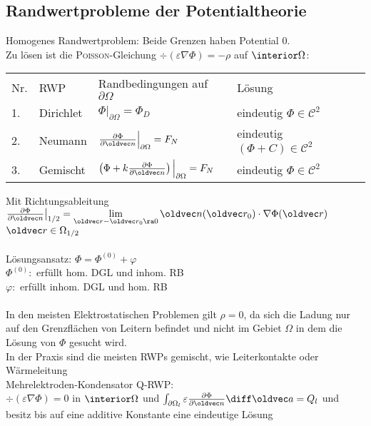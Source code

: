 \documentclass[6pt,a4paper]{scrartcl}
\let\vec\oldvec
\begin{document}
\begin{multicols}{4}
	\subsection{Randwertprobleme der Potentialtheorie}
	Homogenes Randwertproblem: Beide Grenzen haben Potential 0.\\
	Zu lösen ist die \textsc{Poisson}-Gleichung $\div(\varepsilon \nabla \Phi) = -\rho$ auf $\interior \Omega$:\\
	\begin{tabular*}{\columnwidth}{@{\extracolsep\fill}llll@{}}
	Nr. & RWP & Randbedingungen auf $\partial \Omega$ & Lösung\\
	1. & Dirichlet & $\Phi\big|_{\partial\Omega} = \Phi_D$ & eindeutig $\Phi \in \mathcal C^2$\\[0.5em]
	2. & Neumann & $\frac{\partial \Phi}{\partial \vec n}\Big|_{\partial\Omega} = F_N$ & eindeutig $(\Phi + C) \in \mathcal C^2$\\[0.5em]
	3. & Gemischt & $\left( \Phi + k \frac{\partial \Phi}{\partial \vec n}\right)\Big|_{\partial\Omega} = F_N$ & eindeutig $\Phi \in \mathcal C^2$\\
	\end{tabular*} 
	Mit Richtungsableitung $\frac{\partial \Phi}{\partial \vec n}\big|_{1/2} = \lim\limits_{\vec r - \vec r_0 \ra 0} \vec n(\vec r_0) \cdot \nabla\Phi(\vec r)$ \quad $\vec r \in \Omega_{1/2}$\\
	\\
	Lösungsansatz: $\Phi = \Phi^{(0)} + \varphi$\\
	$\Phi^{(0)}:$ erfüllt hom. DGL und inhom. RB\\
	$\varphi:$ erfüllt inhom. DGL und hom. RB\\
	\\
	In den meisten Elektrostatischen Problemen gilt $\rho = 0$, da sich die Ladung nur auf den Grenzflächen von Leitern befindet und nicht im Gebiet $\Omega$ in dem die Lösung von $\Phi$ gesucht wird.\\
	In der Praxis sind die meisten RWPs gemischt, wie Leiterkontakte oder Wärmeleitung\\ 
	
	Mehrelektroden-Kondensator Q-RWP:\\
	$\div(\varepsilon \nabla \Phi) = 0$ in $\interior \Omega$ und $\int_{\partial \Omega_l} \varepsilon \frac{\partial \Phi}{\partial \vec n} \diff \vec a = Q_l$ und  besitz bis auf eine additive Konstante eine eindeutige Lösung
	

\end{multicols}
\end{document}
